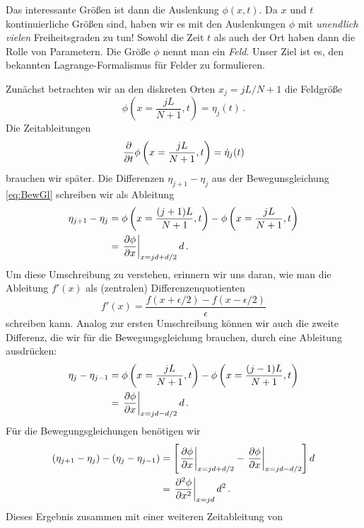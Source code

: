 \documentclass[paper=a4, fontsize=11.0pt, abstractoff, DIV12]{scrartcl}
\begin{document}
Das interessante Größen ist dann die Auslenkung $\phi(x, t)$. Da $x$ und $t$
kontinuierliche Größen sind, haben wir es mit den Auslenkungen $\phi$ mit
\emph{unendlich vielen} Freiheitsgraden zu tun! Sowohl die Zeit $t$ als auch
der Ort haben dann die Rolle von Parametern. Die Größe $\phi$ nennt man ein
\emph{Feld}. Unser Ziel ist es, den bekannten Lagrange-Formalismus für
Felder zu formulieren.

Zunächst betrachten wir an den diskreten Orten $x_j = jL/N+1$ die Feldgröße
\begin{equation}
\phi\left(x=\frac{jL}{N+1}, t\right) = \eta_j(t)\,.
\end{equation}
Die Zeitableitungen
\begin{equation}
\frac{\partial }{\partial t}\phi\left(x=\frac{jL}{N+1}, t\right) = \dot\eta_j(t)
\label{eq:ZeitAbl}
\end{equation}
brauchen wir später. Die Differenzen $\eta_{j+1}-\eta_j$ aus der
Bewegunsgleichung \eqref{eq:BewGl} schreiben wir als Ableitung
\begin{align}
\eta_{j+1}-\eta_j &=\phi\left(x=\frac{(j+1)L}{N+1}, t\right) - \phi\left(x=\frac{jL}{N+1}, t\right)\nonumber\\
&=\left.\frac{\partial \phi}{\partial x}\right\vert_{x=jd+d/2}d\,.
\end{align}
Um diese Umschreibung zu verstehen, erinnern wir uns daran, wie man die
Ableitung $f'(x)$ als (zentralen) Differenzenquotienten
\begin{equation*}
f'(x) = \frac{f(x+\epsilon/2) - f(x-\epsilon/2)}{\epsilon}
\end{equation*}
schreiben kann. Analog zur ersten Umschreibung können wir auch die zweite
Differenz, die wir für die Bewegungsgleichung brauchen, durch eine Ableitung
ausdrücken:
\begin{align}
\eta_{j}-\eta_{j-1} &= \phi\left(x=\frac{jL}{N+1}, t\right) - \phi\left(x=\frac{(j-1)L}{N+1}, t\right)\nonumber\\
&=\left.\frac{\partial \phi}{\partial x}\right\vert_{x=jd-d/2}d\,.
\end{align}
Für die Bewegungsgleichungen benötigen wir
\begin{align}
(\eta_{j+1} - \eta_j) - (\eta_j-\eta_{j-1}) &= \left[\left.\frac{\partial \phi}{\partial x}\right\vert_{x=jd+d/2} - \left.\frac{\partial \phi}{\partial x}\right\vert_{x=jd-d/2}\right]d\nonumber\\
&=\left.\frac{\partial^2 \phi}{\partial {x}^2}\right\vert_{x=jd} d^2\,.
\end{align}
Dieses Ergebnis zusammen mit einer weiteren Zeitableitung von
\end{document}
